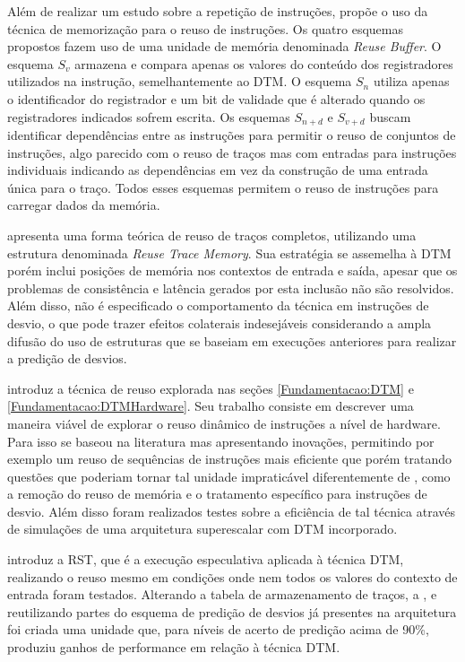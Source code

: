 Além de realizar um estudo sobre a repetição de instruções,  propõe o uso da técnica de memorização para o reuso de instruções. Os quatro esquemas propostos fazem uso de uma unidade de memória denominada \textit{Reuse Buffer}. O esquema $S_{v}$ armazena e compara apenas os valores do conteúdo dos registradores utilizados na instrução, semelhantemente ao DTM. O esquema $S_{n}$ utiliza apenas o identificador do registrador e um bit de validade que é alterado quando os registradores indicados sofrem escrita. Os esquemas $S_{n+d}$ e $S_{v+d}$ buscam identificar dependências entre as instruções para permitir o reuso de conjuntos de instruções, algo parecido com o reuso de traços mas com entradas para instruções individuais indicando as dependências em vez da construção de uma entrada única para o traço. Todos esses esquemas permitem o reuso de instruções para carregar dados da memória.

 apresenta uma forma teórica de reuso de traços completos, utilizando uma estrutura denominada \textit{Reuse Trace Memory}. Sua estratégia se assemelha à DTM porém inclui posições de memória nos contextos de entrada e saída, apesar que os problemas de consistência e latência gerados por esta inclusão não são resolvidos. Além disso, não é especificado o comportamento da técnica em instruções de desvio, o que pode trazer efeitos colaterais indesejáveis considerando a ampla difusão do uso de estruturas que se baseiam em execuções anteriores para realizar a predição de desvios.

 introduz a técnica de reuso explorada nas seções \ref{Fundamentacao:DTM} e \ref{Fundamentacao:DTMHardware}. Seu trabalho consiste em descrever uma maneira viável de explorar o reuso dinâmico de instruções a nível de hardware. Para isso se baseou na literatura mas apresentando inovações, permitindo por exemplo um reuso de sequências de instruções mais eficiente que  porém tratando questões que poderiam tornar tal unidade impraticável diferentemente de , como a remoção do reuso de memória e o tratamento específico para instruções de desvio. Além disso foram realizados testes sobre a eficiência de tal técnica através de simulações de uma arquitetura superescalar com DTM incorporado.

 introduz a RST, que é a execução especulativa aplicada à técnica DTM, realizando o reuso mesmo em condições onde nem todos os valores do contexto de entrada foram testados. Alterando a tabela de armazenamento de traços, a \tablet, e reutilizando partes do esquema de predição de desvios já presentes na arquitetura foi criada uma unidade que, para níveis de acerto de predição acima de 90\%, produziu ganhos de performance em relação à técnica DTM.


